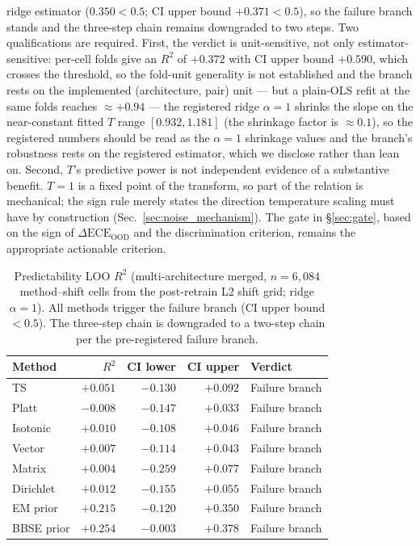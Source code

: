 \documentclass[review,12pt,nonatbib]{elsarticle}
\begin{document}
ridge estimator ($0.350 < 0.5$; CI upper bound $+0.371 < 0.5$), so
the failure branch stands and the three-step chain remains downgraded to
two steps. Two qualifications are required. First, the verdict is
unit-sensitive, not only estimator-sensitive: per-cell folds give an
$R^2$ of $+0.372$ with CI upper bound $+0.590$, which crosses the
threshold, so the fold-unit generality is not established and the
branch rests on the implemented (architecture, pair) unit --- but a plain-OLS
refit at the same folds reaches $\approx+0.94$ --- the registered
ridge $\alpha{=}1$ shrinks the slope on the near-constant fitted $T$
range $[0.932, 1.181]$ (the shrinkage factor is $\approx 0.1$), so the
registered numbers should be read as the $\alpha{=}1$ shrinkage values
and the branch's robustness rests on the registered estimator, which we
disclose rather than lean on. Second, $T$'s predictive power is not independent evidence
of a substantive benefit. $T=1$ is a fixed point of the transform, so
part of the relation is mechanical; the sign rule merely states the
direction temperature scaling must have by construction
(Sec.~\ref{sec:noise_mechanism}). The gate in \S\ref{sec:gate}, based on
the sign of $\Delta\text{ECE}_{\text{OOD}}$ and the discrimination
criterion, remains the appropriate actionable criterion.

\begin{table}[t]
\centering
\caption{Predictability LOO $R^2$ (multi-architecture merged,
$n=6{,}084$ method--shift cells from the post-retrain L2 shift grid;
ridge $\alpha{=}1$). All
methods trigger the failure branch (CI upper bound $<0.5$). The
three-step chain is downgraded to a two-step chain per the
pre-registered failure branch.}
\label{tab:predictability}
\begin{tabular}{lrrrl}
\toprule
Method & $R^2$ & CI lower & CI upper & Verdict \\
\midrule
TS         & $+0.051$ & $-0.130$ & $+0.092$ & Failure branch \\
Platt      & $-0.008$ & $-0.147$ & $+0.033$ & Failure branch \\
Isotonic   & $+0.010$ & $-0.108$ & $+0.046$ & Failure branch \\
Vector     & $+0.007$ & $-0.114$ & $+0.043$ & Failure branch \\
Matrix     & $+0.004$ & $-0.259$ & $+0.077$ & Failure branch \\
Dirichlet  & $+0.012$ & $-0.155$ & $+0.055$ & Failure branch \\
EM prior   & $+0.215$ & $-0.120$ & $+0.350$ & Failure branch \\
BBSE prior & $+0.254$ & $-0.003$ & $+0.378$ & Failure branch \\
\bottomrule
\end{tabular}
\end{table}
\end{document}
